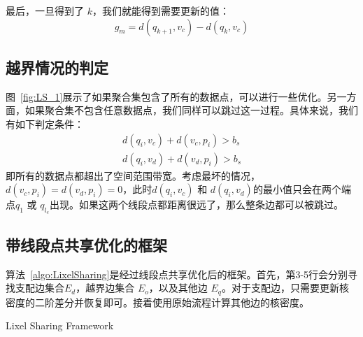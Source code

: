 最后，一旦得到了 $k$，我们就能得到需要更新的值：
\begin{equation*}
    g_m = d(q_{k+1}, v_c) - d(q_k, v_c)
\end{equation*}


\subsection{越界情况的判定}

图~\ref{fig:LS_1}展示了如果聚合集包含了所有的数据点，可以进行一些优化。另一方面，如果聚合集不包含任意数据点，我们同样可以跳过这一过程。具体来说，我们有如下判定条件：
\begin{equation*}
\begin{aligned}
    d(q_i, v_c) + d(v_c, p_i) > b_s \\
    d(q_i, v_d) + d(v_d, p_i) > b_s
\end{aligned}
\end{equation*}
即所有的数据点都超出了空间范围带宽。考虑最坏的情况，$d(v_c, p_i) = d(v_d, p_i) = 0$，此时$d(q_i, v_c)$ 和 $d(q_i, v_d)$的最小值只会在两个端点$q_1$ 或 $q_{l_e}$出现。如果这两个线段点都距离很远了，那么整条边都可以被跳过。


\subsection{带线段点共享优化的框架}

算法~\ref{algo:LixelSharing}是经过线段点共享优化后的框架。首先，第3-5行会分别寻找支配边集合$E_d$，越界边集合 $E_o$，以及其他边 $E_q$。对于支配边，只需要更新核密度的二阶差分并恢复即可。接着使用原始流程计算其他边的核密度。

\begin{algorithm}[h]
	\caption{Lixel Sharing Framework}
	\label{algo:LixelSharing}
	\DontPrintSemicolon
	
\end{algorithm}

